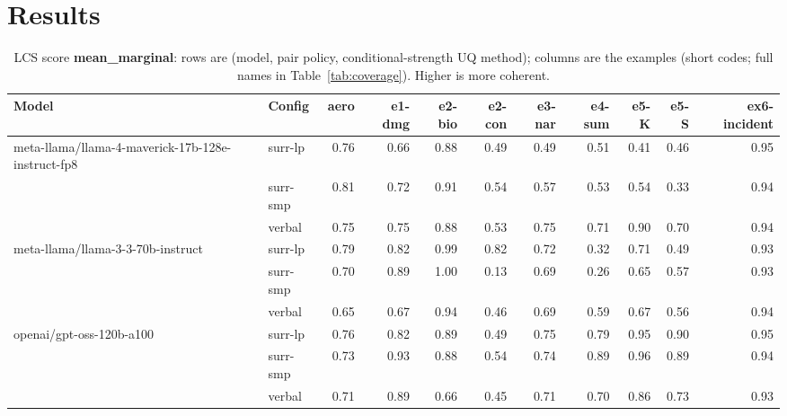 \documentclass[11pt]{article}
\begin{document}
\section{Results}

\begin{table}[htbp]
\centering
\footnotesize
\setlength{\tabcolsep}{3.5pt}
\caption{LCS score \textbf{mean\_marginal}: rows are (model, pair policy, conditional-strength UQ method); columns are the examples (short codes; full names in Table~\ref{tab:coverage}). Higher is more coherent.}
\label{tab:mean-marginal}
\begin{tabular}{llrrrrrrrrr}
\toprule
\textbf{Model} & \textbf{Config} & \textbf{aero} & \textbf{e1-dmg} & \textbf{e2-bio} & \textbf{e2-con} & \textbf{e3-nar} & \textbf{e4-sum} & \textbf{e5-K} & \textbf{e5-S} & \textbf{ex6-incident} \\
\midrule
meta-llama/llama-4-maverick-17b-128e-instruct-fp8 & surr-lp & 0.76 & 0.66 & 0.88 & 0.49 & 0.49 & 0.51 & 0.41 & 0.46 & 0.95 \\
 & surr-smp & 0.81 & 0.72 & 0.91 & 0.54 & 0.57 & 0.53 & 0.54 & 0.33 & 0.94 \\
 & verbal & 0.75 & 0.75 & 0.88 & 0.53 & 0.75 & 0.71 & 0.90 & 0.70 & 0.94 \\
\midrule
meta-llama/llama-3-3-70b-instruct & surr-lp & 0.79 & 0.82 & 0.99 & 0.82 & 0.72 & 0.32 & 0.71 & 0.49 & 0.93 \\
 & surr-smp & 0.70 & 0.89 & 1.00 & 0.13 & 0.69 & 0.26 & 0.65 & 0.57 & 0.93 \\
 & verbal & 0.65 & 0.67 & 0.94 & 0.46 & 0.69 & 0.59 & 0.67 & 0.56 & 0.94 \\
\midrule
openai/gpt-oss-120b-a100 & surr-lp & 0.76 & 0.82 & 0.89 & 0.49 & 0.75 & 0.79 & 0.95 & 0.90 & 0.95 \\
 & surr-smp & 0.73 & 0.93 & 0.88 & 0.54 & 0.74 & 0.89 & 0.96 & 0.89 & 0.94 \\
 & verbal & 0.71 & 0.89 & 0.66 & 0.45 & 0.71 & 0.70 & 0.86 & 0.73 & 0.93 \\
\bottomrule
\end{tabular}
\end{table}
\end{document}
